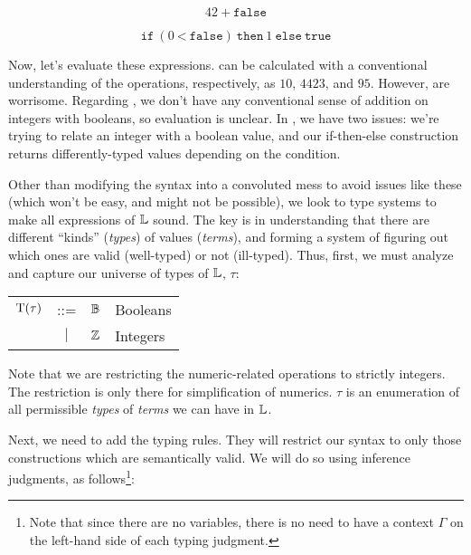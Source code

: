\begin{equation}
      42\ \texttt{+}\ \texttt{false}
      \label{ex:sl:s:bad1}
\end{equation}

\begin{equation}
      \texttt{if}\ (0\ \texttt{<}\ \texttt{false})\ \texttt{then}\ 1\ \texttt{else}\ \texttt{true}
      \label{ex:sl:s:bad2}
\end{equation}


Now, let's evaluate these expressions.
 can be calculated with a
conventional understanding of the operations, respectively, as \(10\), \(4423\),
and \(95\). However,  are worrisome. Regarding
, we don't have any conventional sense of addition on
integers with booleans, so evaluation is unclear. In , we
have two issues: we're trying to relate an integer with a boolean value, and our
if-then-else construction returns differently-typed values depending on the
condition.


Other than modifying the syntax into a convoluted mess to avoid issues like
these (which won't be easy, and might not be possible), we look to type systems
to make all expressions of \(\mathbb{L}\) sound. The key is in understanding that
there are different ``kinds'' (\textit{types}) of values (\textit{terms}), and
forming a system of figuring out which ones are valid (well-typed) or not
(ill-typed). Thus, first, we must analyze and capture our universe of types of
\(\mathbb{L}\), \(\tau\):

\begin{longtable}{ r c c l}
      \(\mathrm{T}(\tau)\) & ::=       & \(\mathbb{B}\) & Booleans \\
                     & \(\vert\) & \(\mathbb{Z}\) & Integers
\end{longtable}

Note that we are restricting the numeric-related operations to strictly
integers. The restriction is only there for simplification of numerics. \(\tau\)
is an enumeration of all permissible \textit{types} of \textit{terms} we can
have in \(\mathbb{L}\).

Next, we need to add the typing rules. They will restrict our syntax to only
those constructions which are semantically valid. We will do so using inference
judgments, as follows\footnote{Note that since there are no variables, there is
no need to have a context \(\Gamma\) on the left-hand side of each typing
judgment.}:

